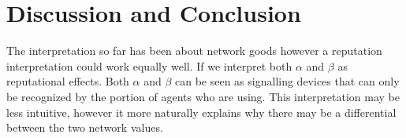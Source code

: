 






\section{Discussion and Conclusion}
The interpretation so far has been about network goods however a reputation interpretation could work equally well. If we interpret both $\alpha$ and $\beta$ as reputational effects. Both $\alpha$ and $\beta$ can be seen as signalling devices that can only be recognized by the portion of agents who are using. This interpretation may be less intuitive, however it more naturally explains why there may be a differential between the two network values.

